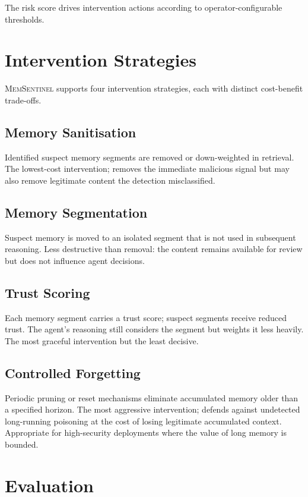 \documentclass[sigconf,nonacm]{acmart}
\begin{document}
The risk score drives intervention actions according to
operator-configurable thresholds.

\section{Intervention Strategies}

\textsc{MemSentinel} supports four intervention strategies, each
with distinct cost-benefit trade-offs.

\subsection{Memory Sanitisation}

Identified suspect memory segments are removed or down-weighted in
retrieval. The lowest-cost intervention; removes the immediate
malicious signal but may also remove legitimate content the
detection misclassified.

\subsection{Memory Segmentation}

Suspect memory is moved to an isolated segment that is not used in
subsequent reasoning. Less destructive than removal: the content
remains available for review but does not influence agent
decisions.

\subsection{Trust Scoring}

Each memory segment carries a trust score; suspect segments receive
reduced trust. The agent's reasoning still considers the segment but
weights it less heavily. The most graceful intervention but the
least decisive.

\subsection{Controlled Forgetting}

Periodic pruning or reset mechanisms eliminate accumulated memory
older than a specified horizon. The most aggressive intervention;
defends against undetected long-running poisoning at the cost of
losing legitimate accumulated context. Appropriate for high-security
deployments where the value of long memory is bounded.

\section{Evaluation}
\end{document}
